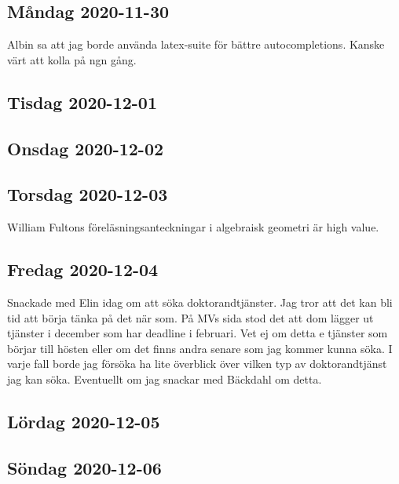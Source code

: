 
\subsection{Måndag 2020-11-30}
Albin sa att jag borde använda latex-suite för bättre autocompletions. Kanske värt att kolla på ngn gång.
\subsection{Tisdag 2020-12-01}
\subsection{Onsdag 2020-12-02}
\subsection{Torsdag 2020-12-03}

William Fultons föreläsningsanteckningar i algebraisk geometri är high value.

\subsection{Fredag 2020-12-04}

Snackade med Elin idag om att söka doktorandtjänster. Jag tror att det kan bli tid att börja tänka på det när som. På MVs sida stod det att dom lägger ut tjänster i december som har deadline i februari. Vet ej om detta e tjänster som börjar till hösten eller om det finns andra senare som jag kommer kunna söka. I varje fall borde jag försöka ha lite överblick över vilken typ av doktorandtjänst jag kan söka. Eventuellt om jag snackar med Bäckdahl om detta.


\subsection{Lördag 2020-12-05}
 \subsection{Söndag 2020-12-06}
